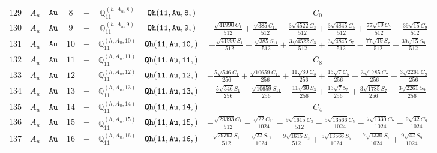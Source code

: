 \documentclass[fleqn,8pt]{jsarticle}
\begin{document}
\begin{table}[ht!]
\begin{center}
\begin{tabular}{cccccccc}
$ 129 $ & $ A_{u} $ & $ {\tt Au} $ & $ 8 $ & $ - $ & $ \mathbb{Q}_{11}^{(h,A_{u},8)} $ & $ {\tt Qh(11,Au,8,)} $ & $ C_{0} $ \\
$ 130 $ & $ A_{u} $ & $ {\tt Au} $ & $ 9 $ & $ - $ & $ \mathbb{Q}_{11}^{(h,A_{u},9)} $ & $ {\tt Qh(11,Au,9,)} $ & $ - \frac{\sqrt{41990} C_{1}}{512} + \frac{\sqrt{385} C_{11}}{512} - \frac{3 \sqrt{4522} C_{3}}{512} + \frac{3 \sqrt{4845} C_{5}}{512} + \frac{77 \sqrt{19} C_{7}}{512} + \frac{39 \sqrt{15} C_{9}}{512} $ \\
$ 131 $ & $ A_{u} $ & $ {\tt Au} $ & $ 10 $ & $ - $ & $ \mathbb{Q}_{11}^{(h,A_{u},10)} $ & $ {\tt Qh(11,Au,10,)} $ & $ - \frac{\sqrt{41990} S_{1}}{512} - \frac{\sqrt{385} S_{11}}{512} + \frac{3 \sqrt{4522} S_{3}}{512} + \frac{3 \sqrt{4845} S_{5}}{512} - \frac{77 \sqrt{19} S_{7}}{512} + \frac{39 \sqrt{15} S_{9}}{512} $ \\
$ 132 $ & $ A_{u} $ & $ {\tt Au} $ & $ 11 $ & $ - $ & $ \mathbb{Q}_{11}^{(h,A_{u},11)} $ & $ {\tt Qh(11,Au,11,)} $ & $ C_{8} $ \\
$ 133 $ & $ A_{u} $ & $ {\tt Au} $ & $ 12 $ & $ - $ & $ \mathbb{Q}_{11}^{(h,A_{u},12)} $ & $ {\tt Qh(11,Au,12,)} $ & $ - \frac{5 \sqrt{546} C_{1}}{256} + \frac{\sqrt{10659} C_{11}}{256} + \frac{11 \sqrt{30} C_{3}}{256} + \frac{13 \sqrt{7} C_{5}}{256} - \frac{3 \sqrt{1785} C_{7}}{256} + \frac{3 \sqrt{2261} C_{9}}{256} $ \\
$ 134 $ & $ A_{u} $ & $ {\tt Au} $ & $ 13 $ & $ - $ & $ \mathbb{Q}_{11}^{(h,A_{u},13)} $ & $ {\tt Qh(11,Au,13,)} $ & $ - \frac{5 \sqrt{546} S_{1}}{256} - \frac{\sqrt{10659} S_{11}}{256} - \frac{11 \sqrt{30} S_{3}}{256} + \frac{13 \sqrt{7} S_{5}}{256} + \frac{3 \sqrt{1785} S_{7}}{256} + \frac{3 \sqrt{2261} S_{9}}{256} $ \\
$ 135 $ & $ A_{u} $ & $ {\tt Au} $ & $ 14 $ & $ - $ & $ \mathbb{Q}_{11}^{(h,A_{u},14)} $ & $ {\tt Qh(11,Au,14,)} $ & $ C_{4} $ \\
$ 136 $ & $ A_{u} $ & $ {\tt Au} $ & $ 15 $ & $ - $ & $ \mathbb{Q}_{11}^{(h,A_{u},15)} $ & $ {\tt Qh(11,Au,15,)} $ & $ - \frac{\sqrt{29393} C_{1}}{512} - \frac{\sqrt{22} C_{11}}{1024} - \frac{9 \sqrt{1615} C_{3}}{512} - \frac{5 \sqrt{13566} C_{5}}{1024} - \frac{7 \sqrt{1330} C_{7}}{1024} - \frac{9 \sqrt{42} C_{9}}{1024} $ \\
$ 137 $ & $ A_{u} $ & $ {\tt Au} $ & $ 16 $ & $ - $ & $ \mathbb{Q}_{11}^{(h,A_{u},16)} $ & $ {\tt Qh(11,Au,16,)} $ & $ \frac{\sqrt{29393} S_{1}}{512} - \frac{\sqrt{22} S_{11}}{1024} - \frac{9 \sqrt{1615} S_{3}}{512} + \frac{5 \sqrt{13566} S_{5}}{1024} - \frac{7 \sqrt{1330} S_{7}}{1024} + \frac{9 \sqrt{42} S_{9}}{1024} $ \\

\end{tabular}
\end{center}
\end{table}
\end{document}
